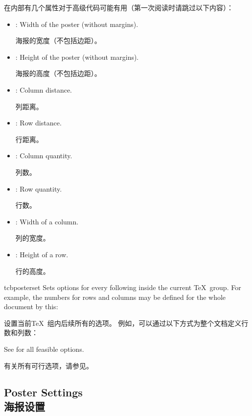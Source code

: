 在内部有几个属性对于高级代码可能有用（第一次阅读时请跳过以下内容）：
\begin{itemize}
\item{}: Width of the poster (without margins).

海报的宽度（不包括边距）。
\item{}: Height of the poster (without margins).

海报的高度（不包括边距）。
\item{}: Column distance.

列距离。
\item{}: Row distance.

行距离。
\item{}: Column quantity.

列数。
\item{}: Row quantity.

行数。
\item{}: Width of a column.

列的宽度。
\item{}: Height of a row.

行的高度。
\end{itemize}

\begin{docCommand}[doc new=2017-07-03]{tcbposterset}{}
Sets options for every following  inside the current \TeX\ group.
For example, the numbers for rows and columns may be defined for the whole document by this:

设置当前\TeX\ 组内后续所有的选项。
例如，可以通过以下方式为整个文档定义行数和列数：
\begin{dispListing}
\end{dispListing}
See  for all feasible options.

有关所有可行选项，请参见。
\end{docCommand}


%
\subsection{Poster Settings\\海报设置}\label{subsec:poster_settings}

